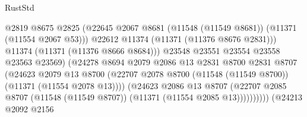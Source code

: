 \begin{lexlean}{RustStd}
\begin{coremodule}
                                              @2819
                                              @8675
                                              @2825
                                              (@22645
                                                @2067
                                                @8681
                                                (@11548 (@11549 @8681))
                                                (@11371 (@11554 @2067 @53)))
                                              @22612
                                              @11374
                                              (@11371 (@11376 @8676 @2831)))
                                            @11374
                                            (@11371 (@11376 @8666 @8684)))
                                          @23548
                                          @23551
                                          @23554
                                          @23558
                                          @23563
                                          @23569)
                                        (@24278
                                          @8694
                                          @2079
                                          @2086
                                          @13
                                          @2831
                                          @8700
                                          @2831
                                          @8707
                                          (@24623
                                            @2079
                                            @13
                                            @8700
                                            (@22707
                                              @2078
                                              @8700
                                              (@11548 (@11549 @8700))
                                              (@11371 (@11554 @2078 @13))))
                                          (@24623
                                            @2086
                                            @13
                                            @8707
                                            (@22707
                                              @2085
                                              @8707
                                              (@11548 (@11549 @8707))
                                              (@11371 (@11554 @2085 @13))))))))))
                              (@24213
                                @2092
                                @2156

\end{coremodule}
\end{lexlean}
